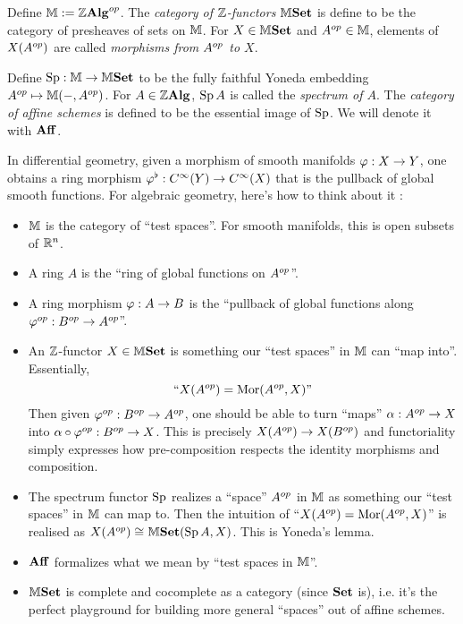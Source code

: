 \documentclass[../main.tex]{subfiles}
\begin{document}
  
\begin{dfn}[$\Z$-Functor]

  Define $\mathbb{M} := \mathbb{Z}\mathbf{Alg}^{op}$.
  The \emph{category of $\Z$-functors}
  $\mathbb{M}\mathbf{Set}$ is define to be the category of 
  presheaves of sets on $\mathbb{M}$. 
  For $X \in \mathbb{M}\mathbf{Set}$ and $A^{op} \in \mathbb{M}$,
  elements of $X(A^{op})$ are called 
  \emph{morphisms from $A^{op}$ to $X$}.

  Define $\operatorname{Sp} : \mathbb{M} \to \mathbb{M}\mathbf{Set}$ to be 
  the fully faithful Yoneda embedding $A^{op} \mapsto \mathbb{M}(-,A^{op})$.
  For $A \in \mathbb{Z}\mathbf{Alg}$, $\operatorname{Sp} A$ is called the \emph{spectrum of $A$}.
  The \emph{category of affine schemes} is defined to be 
  the essential image of $\operatorname{Sp}$.
  We will denote it with $\mathbf{Aff}$.
\end{dfn}

\begin{rmk}
  In differential geometry, 
  given a morphism of smooth manifolds $\varphi : X \to Y$,
  one obtains a ring morphism $\varphi^\flat : C^\infty(Y) \to C^\infty(X)$
  that is the pullback of global smooth functions.
  For algebraic geometry, here's how to think about it : 
  \begin{itemize}
    \item $\mathbb{M}$ is the category of ``test spaces''.
    For smooth manifolds, this is open subsets of $\mathbb{R}^n$.
    \item A ring $A$ is the ``ring of global functions on $A^{op}$''.
    \item A ring morphism $\varphi : A \to B$ is the ``pullback of global functions 
    along $\varphi^{op} : B^{op} \to A^{op}$''.
    \item An $\Z$-functor $X \in \mathbb{M}\mathbf{Set}$ is something
    our ``test spaces'' in $\mathbb{M}$ can ``map into''.
    Essentially,
    \[
      \text{``$X(A^{op}) = \operatorname{Mor}(A^{op} ,X)$''}
    \]
    Then given $\varphi^{op} : B^{op} \to A^{op}$,
    one should be able to turn ``maps'' $\alpha : A^{op} \to X$ into 
    $\alpha \circ \varphi^{op} : B^{op} \to X$.
    This is precisely $X(A^{op}) \to X(B^{op})$ and 
    functoriality simply expresses how pre-composition respects 
    the identity morphisms and composition.
    \item The spectrum functor $\operatorname{Sp}$ realizes 
    a ``space'' $A^{op}$ in $\mathbb{M}$ as something 
    our ``test spaces'' in $\mathbb{M}$ can map to.
    Then the intuition of ``$X(A^{op}) = \operatorname{Mor}(A^{op} ,X)$''
    is realised as $X(A^{op}) \cong_{} \mathbb{M}\mathbf{Set}(\operatorname{Sp} A,X)$.
    This is Yoneda's lemma.
    \item $\mathbf{Aff}$ formalizes what we mean by ``test spaces in $\mathbb{M}$''.
    \item $\mathbb{M}\mathbf{Set}$ is complete and cocomplete as a category (since $\mathbf{Set}$ is),
    i.e. it's the perfect playground for building more general ``spaces''
    out of affine schemes.
  \end{itemize}
\end{rmk}
\end{document}
